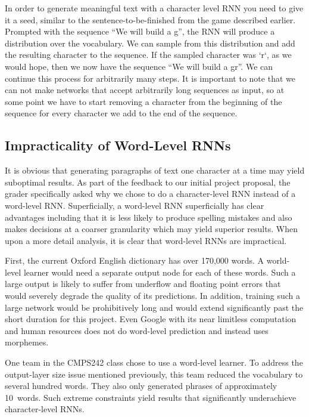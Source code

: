 \documentclass{article}
\begin{document}
In order to generate meaningful text with a character level RNN you need to give it a seed, similar to the sentence-to-be-finished from the game described earlier. Prompted with the sequence ``We will build a g'', the RNN will produce a distribution over the vocabulary. We can sample from this distribution and add the resulting character to the sequence. If the sampled character was `r`, as we would hope, then we now have the sequence ``We will build a gr''. We can continue this process for arbitrarily many steps. It is important to note that we can not make networks that accept arbitrarily long sequences as input, so at some point we have to start removing a character from the beginning of the sequence for every character we add to the end of the sequence.

\subsection{Impracticality of Word-Level RNNs}

It is obvious that generating paragraphs of text one character at a time may yield suboptimal results.  As part of the feedback to our initial project proposal, the grader specifically asked why we chose to do a character-level RNN instead of a word-level RNN.  Superficially, a word-level RNN superficially has clear advantages including that it is less likely to produce spelling mistakes and also makes decisions at a coarser granularity which may yield superior results.  When upon a more detail analysis, it is clear that word-level RNNs are impractical.

First, the current Oxford English dictionary has over 170,000 words. A world-level learner would need a separate output node for each of these words.  Such a large output is likely to suffer from underflow and floating point errors that would severely degrade the quality of its predictions.  In addition, training such a large network would be prohibitively long and would extend significantly past the short duration for this project.  Even Google with its near limitless computation and human resources does not do word-level prediction and instead uses morphemes.  

One team in the CMPS242 class chose to use a word-level learner.  To address the output-layer size issue mentioned previously, this team reduced the vocabulary to several hundred words.  They also only generated phrases of approximately 10~words.  Such extreme constraints yield results that significantly underachieve character-level RNNs.
\end{document}
